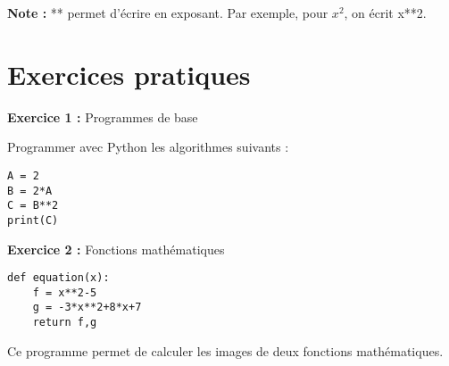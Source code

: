 \documentclass{article}
\begin{document}
\textbf{Note :} ** permet d'écrire en exposant. Par exemple, pour $ x^2 $, on écrit x**2.

\section{Exercices pratiques}

\textbf{Exercice 1 :} Programmes de base

Programmer avec Python les algorithmes suivants :

\begin{center}
\begin{minipage}{4cm}
\begin{lstlisting}
A = 2
B = 2*A
C = B**2
print(C)
\end{lstlisting}
\end{minipage}
\end{center}

\textbf{Exercice 2 :} Fonctions mathématiques

\begin{center}
\begin{minipage}{6cm}
\begin{lstlisting}
def equation(x):
    f = x**2-5
    g = -3*x**2+8*x+7
    return f,g
\end{lstlisting}
\end{minipage}
\end{center}

Ce programme permet de calculer les images de deux fonctions mathématiques.
\end{document}
